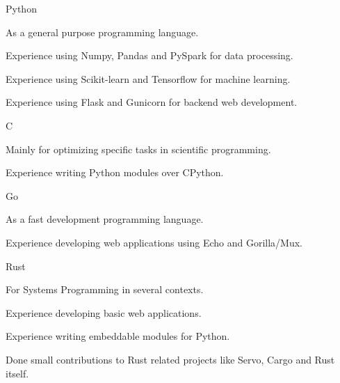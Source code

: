 


\begin{cvskills}


\cvskill
{Python} %
{
  \begin{cvitems}
  \item {As a general purpose programming language.}
  \item {Experience using Numpy, Pandas and PySpark for data processing.}
  \item {Experience using Scikit-learn and Tensorflow for machine learning.}
  \item {Experience using Flask and Gunicorn for backend web development.}
  \end{cvitems}
}


\cvskill
{C} %
{
  \begin{cvitems}
  \item {Mainly for optimizing specific tasks in scientific programming.}
  \item {Experience writing Python modules over CPython.}
  \end{cvitems}
}


\cvskill
{Go} %
{
  \begin{cvitems}
  \item {As a fast development programming language.}
  \item {Experience developing web applications using Echo and Gorilla/Mux.} 
  \end{cvitems}
}


\cvskill
{Rust} %
{
  \begin{cvitems}
  \item {For Systems Programming in several contexts.}
  \item {Experience developing basic web applications.}
  \item {Experience writing embeddable modules for Python.}
  \item {Done small contributions to Rust related projects like Servo, Cargo and Rust itself.}
  \end{cvitems}
}


\end{cvskills}
